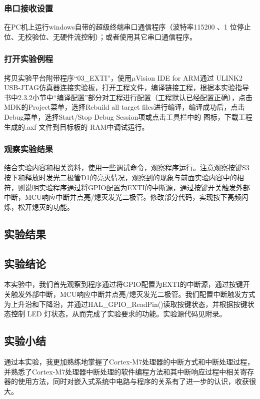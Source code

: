 ﻿\documentclass[UTF8,12pt]{article}
\begin{document}
\subsubsection{串口接收设置}
在PC机上运行windows自带的超级终端串口通信程序（波特率115200 、1 位停止位、无校验位、无硬件流控制）；或者使用其它串口通信程序。

\subsubsection{打开实验例程}
拷贝实验平台附带程序“03\_EXTI”，使用$\mu$Vision IDE for ARM通过 ULINK2 USB-JTAG仿真器连接实验板，打开工程文件，编译链接工程，根据本实验指导书中2.3.2小节中“编译配置”部分对工程进行配置（工程默认已经配置正确），点击MDK的Project菜单，选择Rebuild all target files进行编译，编译成功后，点击Debug菜单，选择Start/Stop Debug Session项或点击工具栏中的 图标，下载工程生成的.axf 文件到目标板的 RAM中调试运行。

\subsubsection{观察实验结果}
结合实验内容和相关资料，使用一些调试命令，观察程序运行。注意观察按键S3按下和释放时发光二极管D1的亮灭情况，观察到的现象与前面实验内容中的相符，则说明实验程序通过将GPIO配置为EXTI的中断源，通过按键开关触发外部中断，MCU响应中断并点亮/熄灭发光二极管。修改部分代码，实现按下高频闪烁，松开熄灭的功能。

\subsection{实验结果}

\subsection{实验结论}
本实验中，我们首先观察到程序通过将GPIO配置为EXTI的中断源，通过按键开关触发外部中断，MCU响应中断并点亮/熄灭发光二极管。我们配置中断触发方式为上升沿和下降沿，并通过HAL\_GPIO\_ReadPin()读取按键状态，并根据按键状态控制 LED 灯状态，从而完成了实验要求的功能。实验源代码见附录。

\subsection{实验小结}
通过本实验，我更加熟练地掌握了Cortex-M7处理器的中断方式和中断处理过程，并熟悉了Cortex-M7处理器中断处理的软件编程方法和其中断响应过程中相关寄存器的使用方法，同时对嵌入式系统中电路与程序的关系有了进一步的认识，收获很大。
\end{document}
